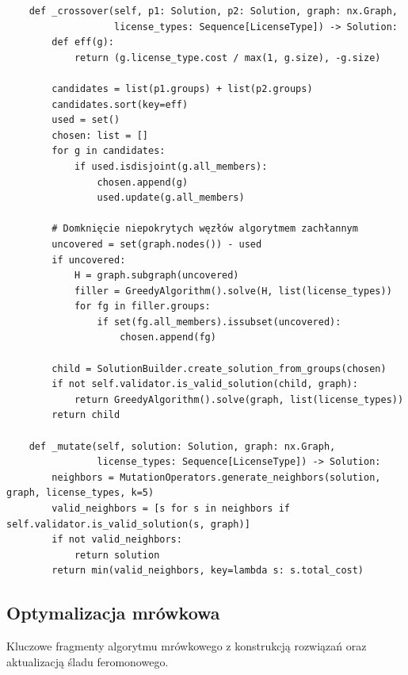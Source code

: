 {\begin{verbatim}
    def _crossover(self, p1: Solution, p2: Solution, graph: nx.Graph,
                   license_types: Sequence[LicenseType]) -> Solution:
        def eff(g):
            return (g.license_type.cost / max(1, g.size), -g.size)

        candidates = list(p1.groups) + list(p2.groups)
        candidates.sort(key=eff)
        used = set()
        chosen: list = []
        for g in candidates:
            if used.isdisjoint(g.all_members):
                chosen.append(g)
                used.update(g.all_members)

        # Domknięcie niepokrytych węzłów algorytmem zachłannym
        uncovered = set(graph.nodes()) - used
        if uncovered:
            H = graph.subgraph(uncovered)
            filler = GreedyAlgorithm().solve(H, list(license_types))
            for fg in filler.groups:
                if set(fg.all_members).issubset(uncovered):
                    chosen.append(fg)

        child = SolutionBuilder.create_solution_from_groups(chosen)
        if not self.validator.is_valid_solution(child, graph):
            return GreedyAlgorithm().solve(graph, list(license_types))
        return child

    def _mutate(self, solution: Solution, graph: nx.Graph,
                license_types: Sequence[LicenseType]) -> Solution:
        neighbors = MutationOperators.generate_neighbors(solution, graph, license_types, k=5)
        valid_neighbors = [s for s in neighbors if self.validator.is_valid_solution(s, graph)]
        if not valid_neighbors:
            return solution
        return min(valid_neighbors, key=lambda s: s.total_cost)
\end{verbatim}
    }

\subsection{Optymalizacja mrówkowa}
Kluczowe fragmenty algorytmu mrówkowego z konstrukcją rozwiązań
oraz aktualizacją śladu feromonowego.

